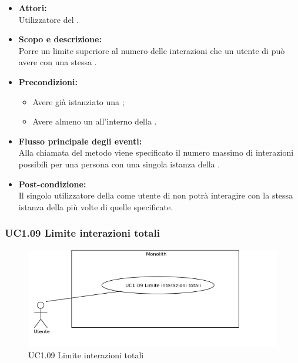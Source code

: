 \begin{itemize}
	\item \textbf{Attori:}
	\\Utilizzatore del .
	\item \textbf{Scopo e descrizione:} 
	\\Porre un limite superiore al numero delle interazioni che un utente di  può avere con una stessa .
	\item \textbf{Precondizioni:}
	\begin{itemize}
		\item Avere già istanziato una ;
		\item Avere almeno un  all'interno della .
	\end{itemize}
	\item \textbf{Flusso principale degli eventi:}
	\\Alla chiamata del metodo viene specificato il numero massimo di interazioni possibili per una persona con una singola istanza della .
	\item \textbf{Post-condizione:}
	\\Il singolo utilizzatore della  come utente di  non potrà interagire con la stessa istanza della  più volte di quelle specificate.
\end{itemize}

\subsubsection{UC1.09 Limite interazioni totali} \label{UC1.09}

\begin{figure}[H]
	\centering
	\includegraphics[width=15cm]{../../documenti/AnalisiDeiRequisiti/Diagrammi_img/uc1_09.png}
	\caption{UC1.09 Limite interazioni totali}
\end{figure}

